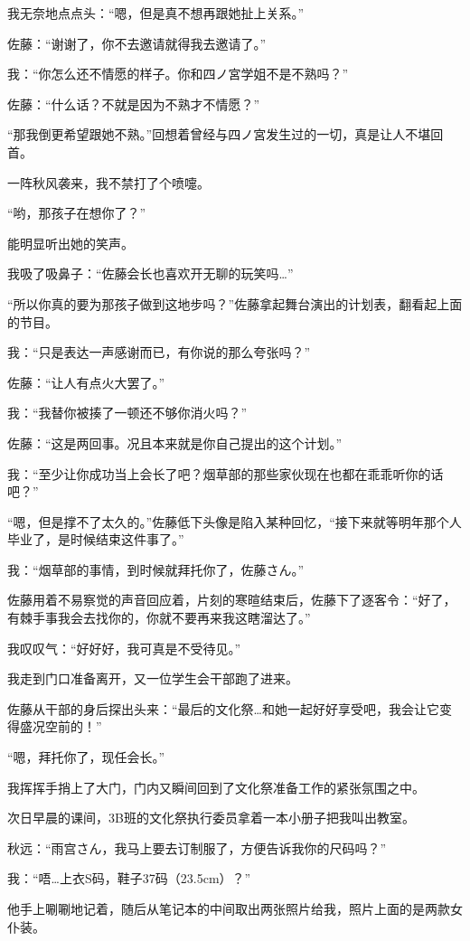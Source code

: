 我无奈地点点头：“嗯，但是真不想再跟她扯上关系。”

佐藤：“谢谢了，你不去邀请就得我去邀请了。”

我：“你怎么还不情愿的样子。你和四ノ宮学姐不是不熟吗？”

佐藤：“什么话？不就是因为不熟才不情愿？”

“那我倒更希望跟她不熟。”回想着曾经与四ノ宮发生过的一切，真是让人不堪回首。

一阵秋风袭来，我不禁打了个喷嚏。

“哟，那孩子在想你了？”

能明显听出她的笑声。

我吸了吸鼻子：“佐藤会长也喜欢开无聊的玩笑吗…”

“所以你真的要为那孩子做到这地步吗？”佐藤拿起舞台演出的计划表，翻看起上面的节目。

我：“只是表达一声感谢而已，有你说的那么夸张吗？”

佐藤：“让人有点火大罢了。”

我：“我替你被揍了一顿还不够你消火吗？”

佐藤：“这是两回事。况且本来就是你自己提出的这个计划。”

我：“至少让你成功当上会长了吧？烟草部的那些家伙现在也都在乖乖听你的话吧？”

“嗯，但是撑不了太久的。”佐藤低下头像是陷入某种回忆，“接下来就等明年那个人毕业了，是时候结束这件事了。”

我：“烟草部的事情，到时候就拜托你了，佐藤さん。”

佐藤用着不易察觉的声音回应着，片刻的寒暄结束后，佐藤下了逐客令：“好了，有棘手事我会去找你的，你就不要再来我这瞎溜达了。”

我叹叹气：“好好好，我可真是不受待见。”

我走到门口准备离开，又一位学生会干部跑了进来。

佐藤从干部的身后探出头来：“最后的文化祭…和她一起好好享受吧，我会让它变得盛况空前的！”

“嗯，拜托你了，现任会长。”

我挥挥手捎上了大门，门内又瞬间回到了文化祭准备工作的紧张氛围之中。

\cutlinec

\newday{\cloudy}

次日早晨的课间，3B班的文化祭执行委员拿着一本小册子把我叫出教室。

秋远：“雨宫さん，我马上要去订制服了，方便告诉我你的尺码吗？”

我：“唔…上衣S码，鞋子37码（23.5cm）？”

他手上唰唰地记着，随后从笔记本的中间取出两张照片给我，照片上面的是两款女仆装。

